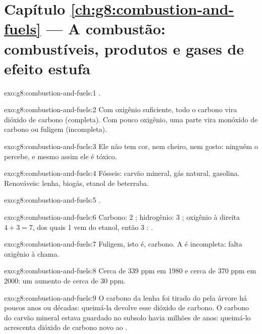 \section*{Capítulo \ref{ch:g8:combustion-and-fuels} --- A combustão: combustíveis, produtos e gases de efeito estufa}

\begin{solution}{exo:g8:combustion-and-fuels:1}
.
\end{solution}

\begin{solution}{exo:g8:combustion-and-fuels:2}
Com oxigênio suficiente, todo o carbono vira dióxido de carbono
(completa). Com pouco oxigênio, uma parte vira monóxido de carbono ou
fuligem (incompleta).
\end{solution}

\begin{solution}{exo:g8:combustion-and-fuels:3}
Ele não tem cor, nem cheiro, nem gosto: ninguém o percebe, e mesmo assim
ele é tóxico.
\end{solution}

\begin{solution}{exo:g8:combustion-and-fuels:4}
Fósseis: carvão mineral, gás natural, gasolina. Renováveis: lenha,
biogás, etanol de beterraba.
\end{solution}

\begin{solution}{exo:g8:combustion-and-fuels:5}
.
\end{solution}

\begin{solution}{exo:g8:combustion-and-fuels:6}
Carbono: 2 ; hidrogênio: 3 ; oxigênio à direita $4 + 3 =
7$, dos quais 1 vem do etanol, então 3 :
.
\end{solution}

\begin{solution}{exo:g8:combustion-and-fuels:7}
Fuligem, isto é, carbono. A  é incompleta: falta oxigênio à
chama.
\end{solution}

\begin{solution}{exo:g8:combustion-and-fuels:8}
Cerca de 339 ppm em 1980 e cerca de 370 ppm em 2000: um aumento de cerca de 30 ppm.
\end{solution}

\begin{solution}{exo:g8:combustion-and-fuels:9}
O carbono da lenha foi tirado do  pela árvore há poucos anos ou
décadas: queimá-la devolve esse dióxido de carbono. O carbono do carvão
mineral estava guardado no subsolo havia milhões de anos: queimá-lo
acrescenta dióxido de carbono novo ao .
\end{solution}

